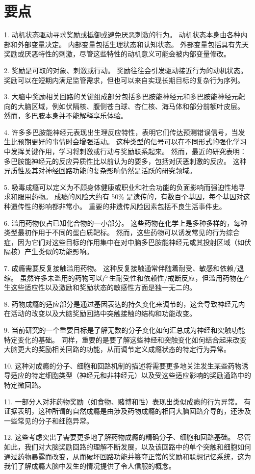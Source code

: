 \section{要点}

1. 动机状态驱动寻求奖励或抵御或避免厌恶刺激的行为。
动机状态本身由各种内部和外部变量决定。
内部变量包括生理状态和认知状态。
外部变量包括具有先天奖励或厌恶特性的刺激，尽管这些特性的动机意义可能会被内部变量修改。


2. 奖励是可取的对象、刺激或行动。
奖励往往会引发驱动接近行为的动机状态。
奖励可以在短期内满足监管需求，但也可以来自实现长期目标的复杂行为序列。


3. 大脑中奖励相关回路的关键组成部分包括多巴胺能神经元和多巴胺能神经元靶向的大脑区域，例如伏隔核、腹侧苍白球、杏仁核、海马体和部分前额叶皮层。
然而，多巴胺本身并不能解释享乐体验。 


4. 许多多巴胺能神经元表现出生理反应特性，表明它们传达预测错误信号，当发生比预期更好的事情时会增强活动。
这种类型的信号可以在不同形式的强化学习中发挥关键作用，学习将刺激或行动与奖励联系起来。
然而，最近的研究表明：多巴胺能神经元的反应异质性比以前认为的要多，包括对厌恶刺激的反应。
这种异质性及其对神经回路功能的复杂影响仍然是活跃的研究领域。


5. 吸毒成瘾可以定义为不顾身体健康或职业和社会功能的负面影响而强迫性地寻求和服用药物。
成瘾的风险大约有 50\% 是遗传的，有数百个基因，每个基因对这种遗传性的影响都非常小。
重要的非遗传风险因素包括不良生活事件史。


6. 滥用药物仅占已知化合物的一小部分。
这些药物在化学上是多种多样的，每种类型最初作用于不同的蛋白质靶标。
然而，这些药物可以诱发常见的行为综合症，因为它们对这些目标的作用集中在对中脑多巴胺能神经元或其投射区域（如伏隔核）产生类似的功能影响。


7. 成瘾需要反复接触滥用药物。
这种反复接触通常伴随着耐受、敏感和依赖/退缩。
虽然许多未滥用的药物可以产生耐受性和依赖性/戒断反应，但滥用药物在产生这些适应性以及激励和奖励状态的敏感性方面是独一无二的。


8. 药物成瘾的适应部分是通过基因表达的持久变化来调节的，这会导致神经元内在活动的改变以及大脑奖励回路中突触接触的结构和功能改变。


9. 当前研究的一个重要目标是了解无数的分子变化如何汇总成为神经和突触功能特定变化的基础。
同样，重要的是要了解这些神经和突触变化如何结合起来改变大脑更大的奖励相关回路的功能，从而调节定义成瘾状态的特定行为异常。


10. 这种对成瘾的分子、细胞和回路机制的描述将需要更多地关注发生某些药物诱导适应的特定细胞类型（神经元和非神经元）以及受这些适应影响的奖励通路中的特定微回路。


11. 一部分人对非药物奖励（如食物、赌博和性）表现出类似成瘾的行为异常。
有证据表明，这种所谓的自然成瘾是由涉及药物成瘾的相同大脑回路介导的，还涉及一些常见的分子和细胞异常。 


12. 这些考虑突出了需要更多地了解药物成瘾的精确分子、细胞和回路基础。
尽管如此，我们对大脑奖励回路的理解不断发展，以及该回路中的单个突触和细胞如何通过药物暴露而改变，从而破坏回路功能并篡夺正常的奖励和联想记忆系统，这为我们了解成瘾大脑中发生的情况提供了令人信服的概念。


